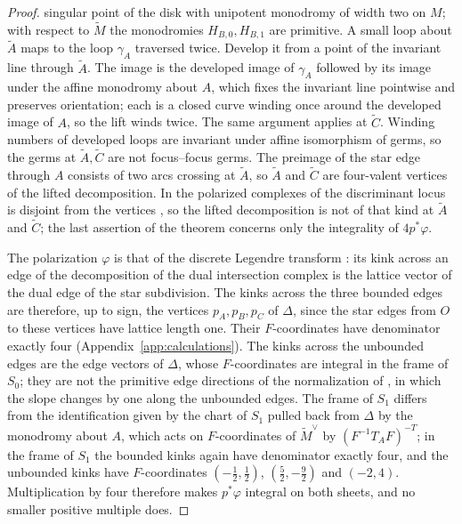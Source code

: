 \begin{proof}
singular point of the disk with unipotent monodromy of width two on $M$; with
respect to $\widetilde M$ the monodromies $H_{B,0},H_{B,1}$ are primitive.  A
small loop about $\widetilde A$ maps to the loop $\gamma_A$ traversed twice.
Develop it from a point of the invariant line through $\widetilde A$.  The
image is the developed image of $\gamma_A$ followed by its image under the
affine monodromy about $A$, which fixes the invariant line pointwise and
preserves orientation; each is a closed curve winding once around the
developed image of $A$, so the lift winds twice.  The same argument applies
at $\widetilde C$.  Winding numbers of developed loops are invariant under
affine isomorphism of germs, so the germs at $\widetilde A,\widetilde C$ are
not focus--focus germs.  The preimage of the star edge through $A$ consists
of two arcs crossing at $\widetilde A$, so $\widetilde A$ and $\widetilde C$
are four-valent vertices of the lifted decomposition.  In the polarized
complexes of \cite{grosssiebert2006,carletal2024} the discriminant locus is
disjoint from the vertices \cite[\S1]{carletal2024}, so the lifted
decomposition is not of that kind at $\widetilde A$ and $\widetilde C$; the
last assertion of the theorem concerns only the integrality of
$4p^*\varphi$.

The polarization $\varphi$ is that of the discrete Legendre transform
\cite[\S1.4]{grosssiebert2006}: its kink across an edge of the
decomposition of the dual intersection complex is the lattice vector of the dual edge of the
star subdivision.  The kinks across the three bounded edges are therefore,
up to sign, the vertices $p_A,p_B,p_C$ of $\Delta$, since the star edges
from $O$ to these vertices have lattice length one.  Their $F$-coordinates
have denominator exactly four (Appendix~\ref{app:calculations}).  The kinks
across the unbounded edges are the edge vectors of $\Delta$, whose
$F$-coordinates are integral in the frame of $S_0$; they are not the
primitive edge directions of the normalization of
\cite[\S7.1]{carletal2024}, in which the slope changes by one along the
unbounded edges.  The frame of $S_1$ differs from the identification given by
the chart of $S_1$ pulled back from $\Delta$ by the monodromy about $A$, which
acts on $F$-coordinates of $\widetilde M^\vee$ by $(F^{-1}T_AF)^{-T}$; in the
frame of $S_1$ the bounded kinks again have denominator exactly four, and the
unbounded kinks have
$F$-coordinates $(-\tfrac12,\tfrac12)$, $(\tfrac52,-\tfrac92)$ and $(-2,4)$.
Multiplication by four therefore makes $p^*\varphi$ integral on both sheets,
and no smaller positive multiple does.
\end{proof}

